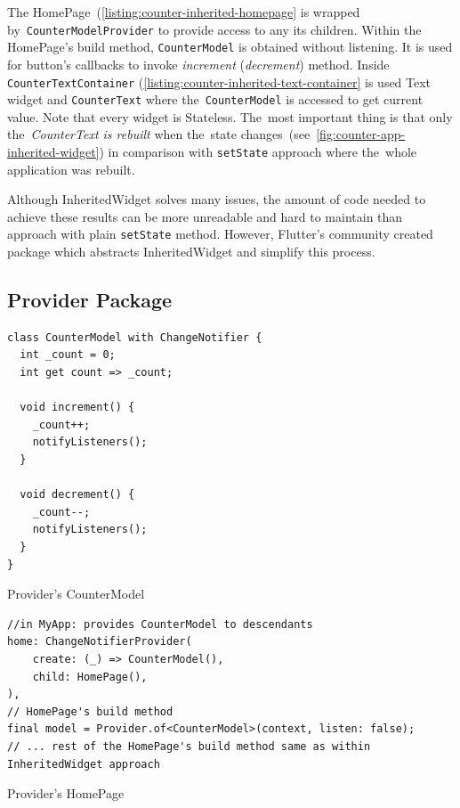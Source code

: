 The HomePage~(\cref{listing:counter-inherited-homepage} is wrapped by~\verb|CounterModelProvider| to provide access to any its children. Within the HomePage's build method, \verb|CounterModel| is obtained without listening. It is used for button's callbacks to invoke \textit{increment} (\textit{decrement}) method. Inside \verb|CounterTextContainer| (\cref{listing:counter-inherited-text-container} is used Text widget and \verb|CounterText| where the~\verb|CounterModel| is accessed to get current value. Note that every widget is Stateless. The~most important thing is that only the~\textit{CounterText is rebuilt} when the~state changes~(see~\cref{fig:counter-app-inherited-widget}) in comparison with \verb|setState| approach where the~whole application was rebuilt.

Although InheritedWidget solves many issues, the amount of code needed to achieve these results can be more unreadable and hard to maintain than approach with plain \verb|setState| method. However, Flutter's community created package which abstracts InheritedWidget and simplify this process. 
\subsection{Provider Package}

\begin{listing}[ht]
\begin{verbatim}
class CounterModel with ChangeNotifier {
  int _count = 0;
  int get count => _count;

  void increment() {
    _count++;
    notifyListeners();
  }

  void decrement() {
    _count--;
    notifyListeners();
  }
}
\end{verbatim}
\caption{Provider's CounterModel}
\label{listing:counter-provider-model}
\end{listing}

\begin{listing}[ht]
\begin{verbatim}
//in MyApp: provides CounterModel to descendants
home: ChangeNotifierProvider(
    create: (_) => CounterModel(),
    child: HomePage(),
),
// HomePage's build method
final model = Provider.of<CounterModel>(context, listen: false);
// ... rest of the HomePage's build method same as within InheritedWidget approach
\end{verbatim}
\caption{Provider's HomePage}
\label{listing:counter-provider-home-page}
\end{listing}

